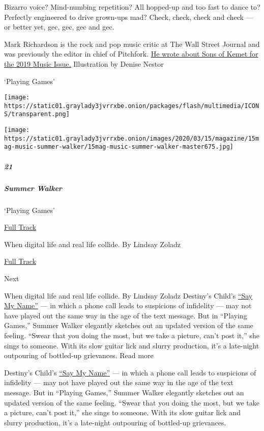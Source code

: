 Bizarro voice? Mind-numbing repetition? All hopped-up and too fast to
dance to? Perfectly engineered to drive grown-ups mad? Check, check,
check and check --- or better yet, gec, gec, gec and gec.

Mark Richardson is the rock and pop music critic at The Wall Street
Journal and was previously the editor in chief of Pitchfork.
\href{https://www.nytimes3xbfgragh.onion/interactive/2019/03/07/magazine/top-songs.html\#/sons-of-kemet}{He
wrote about Sons of Kemet for the 2019 Music Issue.} Illustration by
Denise Nestor

`Playing Games'

\texttt{[image: https://static01.graylady3jvrrxbe.onion/packages/flash/multimedia/ICONS/transparent.png]}

\texttt{[image: https://static01.graylady3jvrrxbe.onion/images/2020/03/15/magazine/15mag-music-summer-walker/15mag-music-summer-walker-master675.jpg]}

\hypertarget{21}{%
\subparagraph{21}\label{21}}

\hypertarget{summer-walker}{%
\subparagraph{Summer Walker}\label{summer-walker}}

`Playing Games'

\href{https://open.spotify.com/track/4hWgC5BV5M7EtTleKVXNxw?si=zZFBfWIpS4-Rk1b_bloNPA}{
Full Track}

When digital life and real life collide. By Lindsay Zoladz

\href{https://open.spotify.com/track/4hWgC5BV5M7EtTleKVXNxw?si=zZFBfWIpS4-Rk1b_bloNPA}{Full
Track }

Next

When digital life and real life collide. By Lindsay Zoladz Destiny's
Child's \href{https://www.youtube.com/watch?v=sQgd6MccwZc}{``Say My
Name''} --- in which a phone call leads to suspicions of infidelity ---
may not have played out the same way in the age of the text message. But
in ``Playing Games,'' Summer Walker elegantly sketches out an updated
version of the same feeling. ``Swear that you doing the most, but we
take a picture, can't post it,'' she sings to someone. With its slow
guitar lick and slurry production, it's a late-night outpouring of
bottled-up grievances. Read more

Destiny's Child's
\href{https://www.youtube.com/watch?v=sQgd6MccwZc}{``Say My Name''} ---
in which a phone call leads to suspicions of infidelity --- may not have
played out the same way in the age of the text message. But in ``Playing
Games,'' Summer Walker elegantly sketches out an updated version of the
same feeling. ``Swear that you doing the most, but we take a picture,
can't post it,'' she sings to someone. With its slow guitar lick and
slurry production, it's a late-night outpouring of bottled-up
grievances.

